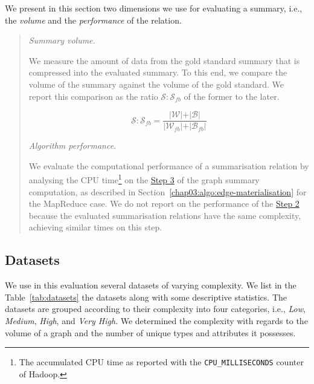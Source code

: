 We present in this section two dimensions we use for evaluating a summary, i.e., the \emph{volume} and the \emph{performance} of the relation.

\begin{quotation}
	\item[\emph{Summary volume.}]

	We measure the amount of data from the gold standard summary that is compressed into the evaluated summary. To this end, we compare the volume of the summary against the volume of the gold standard. We report this comparison as the ratio  $\mathcal{S}:\mathcal{S}_{fb}$ of the former to the later.

	$$
	\mathcal{S}:\mathcal{S}_{fb} = \frac{\vert \mathcal{W} \vert + \vert \mathcal{B} \vert}{\vert \mathcal{W}_{fb} \vert + \vert \mathcal{B}_{fb} \vert}
	$$

	\item[\emph{Algorithm performance.}]

	We evaluate the computational performance of a summarisation relation by analysing the CPU time\footnote{The accumulated CPU time as reported with the \texttt{CPU\_MILLISECONDS} counter of Hadoop.} on the \hyperref[step-he]{Step 3} of the graph summary computation, as described in Section~\ref{chap03:algo:edge-materialisation} for the MapReduce case. We do not report on the performance of the \hyperref[step-hn]{Step 2} because the evaluated summarisation relations have the same complexity, achieving similar times on this step.
\end{quotation}

\subsection{Datasets}
\label{sec:eval:datasets}

We use in this evaluation several datasets of varying complexity. We list in the Table~\ref{tab:datasets} the datasets along with some descriptive statistics. The datasets are grouped according to their complexity into four categories, i.e., \emph{Low}, \emph{Medium}, \emph{High}, and \emph{Very High}. We determined the complexity with regards to the volume of a graph and the number of unique types and attributes it possesses.

